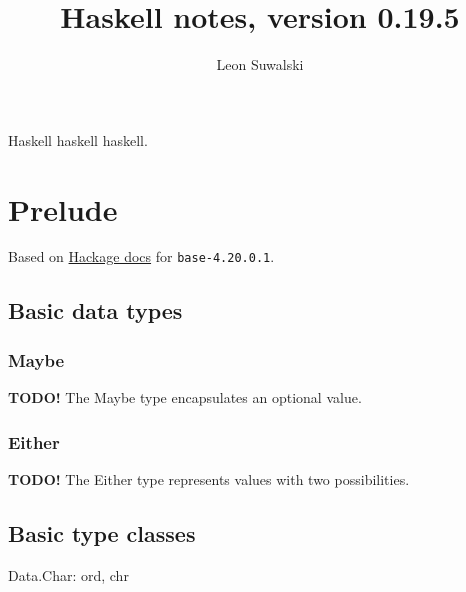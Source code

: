 \documentclass{charun}
\title{Haskell notes, version 0.19.5}
\author{Leon Suwalski}
\begin{document}
\begin{multicols*}{3}
\maketitle
\raggedright
Haskell haskell haskell.
\section{Prelude}
Based on \href{https://hackage.haskell.org/package/base-4.20.0.1/docs/Prelude.html}{Hackage docs} for \texttt{base-4.20.0.1}.

\subsection{Basic data types}




\subsubsection{Maybe}
\textbf{TODO!}
The Maybe type encapsulates an optional value.

\subsubsection{Either}
\textbf{TODO!}
The Either type represents values with two possibilities.





\subsection{Basic type classes}

% 










\newpage








Data.Char: ord, chr


\end{multicols*}
\end{document}
